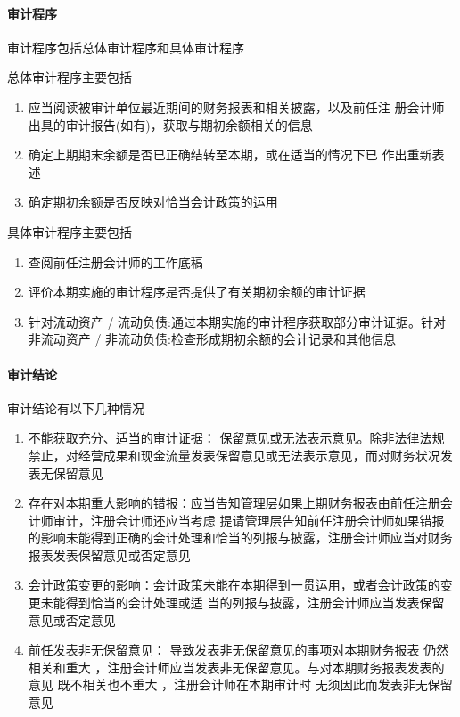 \documentclass[UTF8,12pt]{ctexart}
\numberwithin{equation}{section} %
\numberwithin{figure}{section}
\numberwithin{table}{section}
\begin{document}
	\paragraph{审计程序}
	审计程序包括总体审计程序和具体审计程序
	
	总体审计程序主要包括
	\begin{enumerate}
		\item 应当阅读被审计单位最近期间的财务报表和相关披露，以及前任注 册会计师出具的审计报告(如有)，获取与期初余额相关的信息
		
		\item 确定上期期末余额是否已正确结转至本期，或在适当的情况下已 作出重新表述
		
		\item 确定期初余额是否反映对恰当会计政策的运用
	\end{enumerate}
	
	具体审计程序主要包括
	\begin{enumerate}
		\item 查阅前任注册会计师的工作底稿
		
		\item 评价本期实施的审计程序是否提供了有关期初余额的审计证据
		
		\item 针对流动资产 / 流动负债:通过本期实施的审计程序获取部分审计证据。针对非流动资产 / 非流动负债:检查形成期初余额的会计记录和其他信息
	\end{enumerate}
	
	\paragraph{审计结论}
	审计结论有以下几种情况
	\begin{enumerate}
		\item 不能获取充分、适当的审计证据：
		保留意见或无法表示意见。除非法律法规禁止，对经营成果和现金流量发表保留意见或无法表示意见，而对财务状况发表无保留意见
		
		\item 存在对本期重大影响的错报：应当告知管理层如果上期财务报表由前任注册会计师审计，注册会计师还应当考虑  提请管理层告知前任注册会计师如果错报的影响未能得到正确的会计处理和恰当的列报与披露，注册会计师应当对财务 报表发表保留意见或否定意见
		
		\item 会计政策变更的影响：会计政策未能在本期得到一贯运用，或者会计政策的变更未能得到恰当的会计处理或适 当的列报与披露，注册会计师应当发表保留意见或否定意见
		
		\item 前任发表非无保留意见：
		导致发表非无保留意见的事项对本期财务报表 仍然相关和重大  ，注册会计师应当发表非无保留意见。与对本期财务报表发表的意见  既不相关也不重大  ，注册会计师在本期审计时 无须因此而发表非无保留意见
	\end{enumerate}
	
\end{document}
